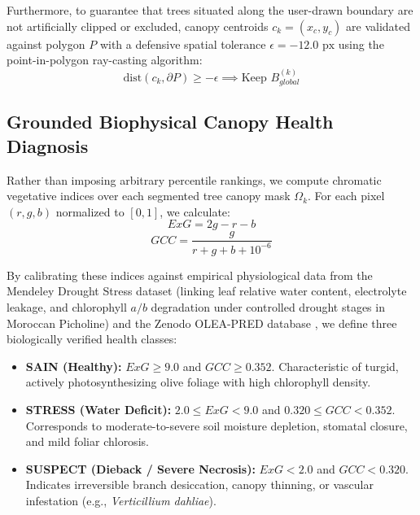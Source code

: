 \documentclass[runningheads]{llncs}
\begin{document}
Furthermore, to guarantee that trees situated along the user-drawn boundary are not artificially clipped or excluded, canopy centroids $c_k = (x_c, y_c)$ are validated against polygon $P$ with a defensive spatial tolerance $\epsilon = -12.0\text{ px}$ using the point-in-polygon ray-casting algorithm:
\begin{equation}
\text{dist}(c_k, \partial P) \ge -\epsilon \implies \text{Keep } B_{global}^{(k)}
\end{equation}

\subsection{Grounded Biophysical Canopy Health Diagnosis}
Rather than imposing arbitrary percentile rankings, we compute chromatic vegetative indices over each segmented tree canopy mask $\Omega_k$. For each pixel $(r, g, b)$ normalized to $[0, 1]$, we calculate:
\begin{equation}
ExG = 2g - r - b
\end{equation}
\begin{equation}
GCC = \frac{g}{r + g + b + 10^{-6}}
\end{equation}

By calibrating these indices against empirical physiological data from the Mendeley Drought Stress dataset \cite{ref10} (linking leaf relative water content, electrolyte leakage, and chlorophyll $a/b$ degradation under controlled drought stages in Moroccan Picholine) and the Zenodo OLEA-PRED database \cite{ref11}, we define three biologically verified health classes:
\begin{itemize}
    \item \textbf{SAIN (Healthy):} $ExG \ge 9.0$ and $GCC \ge 0.352$. Characteristic of turgid, actively photosynthesizing olive foliage with high chlorophyll density.
    \item \textbf{STRESS (Water Deficit):} $2.0 \le ExG < 9.0$ and $0.320 \le GCC < 0.352$. Corresponds to moderate-to-severe soil moisture depletion, stomatal closure, and mild foliar chlorosis.
    \item \textbf{SUSPECT (Dieback / Severe Necrosis):} $ExG < 2.0$ and $GCC < 0.320$. Indicates irreversible branch desiccation, canopy thinning, or vascular infestation (e.g., \textit{Verticillium dahliae}).
\end{itemize}
\end{document}
